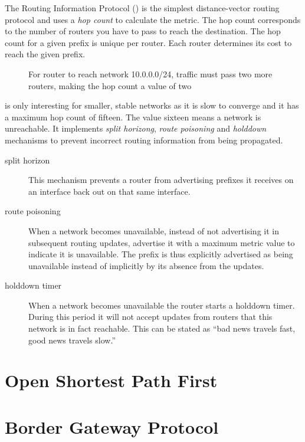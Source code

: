 The Routing Information Protocol () is the simplest distance-vector routing protocol and uses a \emph{hop count} to calculate the metric.
The hop count corresponds to the number of routers you have to pass to reach the destination.
The hop count for a given prefix is unique per router.
Each router determines its cost to reach the given prefix.


\begin{figure}
   \caption{For router  to reach network 10.0.0.0/24, traffic must pass two more routers, making the hop count a value of two}
   \label{fig:routing-rip-hop-count}
\end{figure}


 is only interesting for smaller, stable networks as it is slow to converge and it has a maximum hop count of fifteen.
The value sixteen means a network is unreachable.
It implements \emph{split horizong}, \emph{route poisoning} and \emph{holddown} mechanisms to prevent incorrect routing information from being propagated.

\begin{description}
\item[split horizon]
This mechanism prevents a router from advertising prefixes it receives on an interface back out on that same interface.
\item[route poisoning]
When a network becomes unavailable, instead of not advertising it in subsequent routing updates, advertise it with a maximum metric value to indicate it is unavailable.
The prefix is thus explicitly advertised as being unavailable instead of implicitly by its absence from the updates.
\item[holddown timer]
When a network becomes unavailable the router starts a holddown timer.
During this period it will not accept updates from routers that this network is in fact reachable.
This can be stated as ``bad news travels fast, good news travels slow.''
\end{description}


\section{Open Shortest Path First}
\label{sec:ospf}

\section{Border Gateway Protocol}
\label{sec:bgp}

